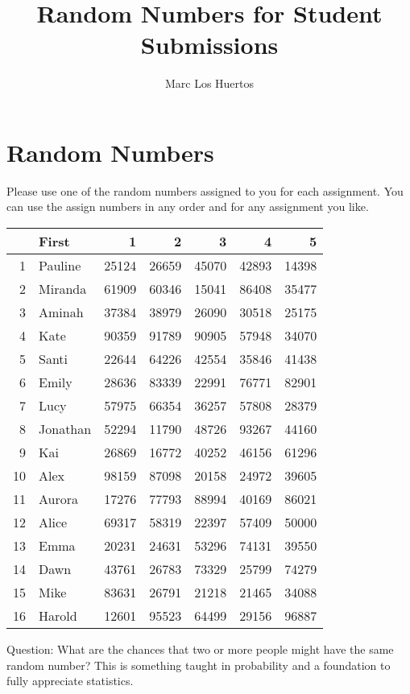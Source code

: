 \documentclass{article}\usepackage[]{graphicx}\usepackage[]{color}
\title{Random Numbers for Student Submissions}
\author{Marc Los Huertos}
\begin{document}
\maketitle


\section*{Random Numbers}

Please use one of the random numbers assigned to you for each assignment. You can use the assign numbers in any order and for any assignment you like. 

\begin{table}[ht]
\centering
\begin{tabular}{rlrrrrr}
  \hline
 & First & 1 & 2 & 3 & 4 & 5 \\ 
  \hline
1 & Pauline & 25124 & 26659 & 45070 & 42893 & 14398 \\ 
  2 & Miranda & 61909 & 60346 & 15041 & 86408 & 35477 \\ 
  3 & Aminah & 37384 & 38979 & 26090 & 30518 & 25175 \\ 
  4 & Kate & 90359 & 91789 & 90905 & 57948 & 34070 \\ 
  5 & Santi & 22644 & 64226 & 42554 & 35846 & 41438 \\ 
  6 & Emily & 28636 & 83339 & 22991 & 76771 & 82901 \\ 
  7 & Lucy & 57975 & 66354 & 36257 & 57808 & 28379 \\ 
  8 & Jonathan & 52294 & 11790 & 48726 & 93267 & 44160 \\ 
  9 & Kai & 26869 & 16772 & 40252 & 46156 & 61296 \\ 
  10 & Alex & 98159 & 87098 & 20158 & 24972 & 39605 \\ 
  11 & Aurora & 17276 & 77793 & 88994 & 40169 & 86021 \\ 
  12 & Alice & 69317 & 58319 & 22397 & 57409 & 50000 \\ 
  13 & Emma & 20231 & 24631 & 53296 & 74131 & 39550 \\ 
  14 & Dawn & 43761 & 26783 & 73329 & 25799 & 74279 \\ 
  15 & Mike & 83631 & 26791 & 21218 & 21465 & 34088 \\ 
  16 & Harold & 12601 & 95523 & 64499 & 29156 & 96887 \\ 
   \hline
\end{tabular}
\end{table}


Question: What are the chances that two or more people might have the same random number?  This is something taught in probability and a foundation to fully appreciate statistics.
\end{document}
